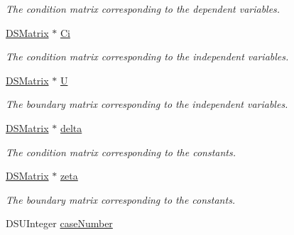 \begin{DoxyCompactItemize}
\begin{DoxyCompactList}\small\item\em The condition matrix corresponding to the dependent variables. \item\end{DoxyCompactList}\item 
\hypertarget{struct_d_s_case_a15a8ddd0ce51e986b28e6bd347a03c4e}{
\hyperlink{struct_d_s_matrix}{DSMatrix} $\ast$ \hyperlink{struct_d_s_case_a15a8ddd0ce51e986b28e6bd347a03c4e}{Ci}}
\label{struct_d_s_case_a15a8ddd0ce51e986b28e6bd347a03c4e}

\begin{DoxyCompactList}\small\item\em The condition matrix corresponding to the independent variables. \item\end{DoxyCompactList}\item 
\hypertarget{struct_d_s_case_a2414d45c3be60e7ce067340f628bca3a}{
\hyperlink{struct_d_s_matrix}{DSMatrix} $\ast$ \hyperlink{struct_d_s_case_a2414d45c3be60e7ce067340f628bca3a}{U}}
\label{struct_d_s_case_a2414d45c3be60e7ce067340f628bca3a}

\begin{DoxyCompactList}\small\item\em The boundary matrix corresponding to the independent variables. \item\end{DoxyCompactList}\item 
\hypertarget{struct_d_s_case_add8d5891b05771aadcaf8c02b8b3eaec}{
\hyperlink{struct_d_s_matrix}{DSMatrix} $\ast$ \hyperlink{struct_d_s_case_add8d5891b05771aadcaf8c02b8b3eaec}{delta}}
\label{struct_d_s_case_add8d5891b05771aadcaf8c02b8b3eaec}

\begin{DoxyCompactList}\small\item\em The condition matrix corresponding to the constants. \item\end{DoxyCompactList}\item 
\hypertarget{struct_d_s_case_aa4b266ea97ab90471cced4315c114e44}{
\hyperlink{struct_d_s_matrix}{DSMatrix} $\ast$ \hyperlink{struct_d_s_case_aa4b266ea97ab90471cced4315c114e44}{zeta}}
\label{struct_d_s_case_aa4b266ea97ab90471cced4315c114e44}

\begin{DoxyCompactList}\small\item\em The boundary matrix corresponding to the constants. \item\end{DoxyCompactList}\item 
\hypertarget{struct_d_s_case_a6cd3e79aa8ec931d4d3bad3723606efe}{
DSUInteger \hyperlink{struct_d_s_case_a6cd3e79aa8ec931d4d3bad3723606efe}{caseNumber}}
\label{struct_d_s_case_a6cd3e79aa8ec931d4d3bad3723606efe}


\end{DoxyCompactItemize}
